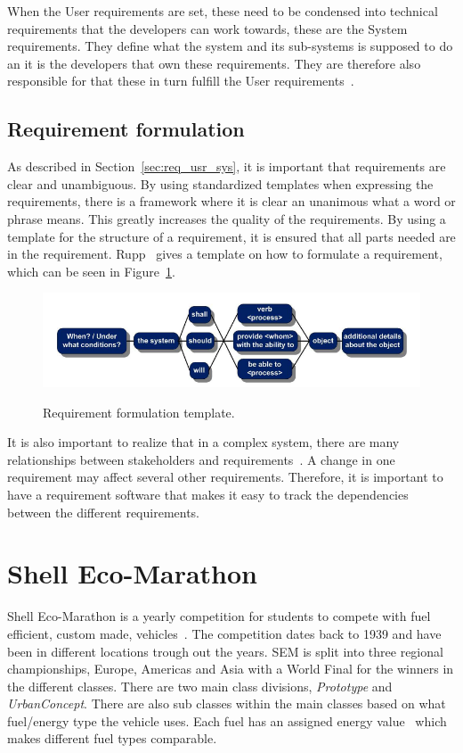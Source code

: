 When the User requirements are set, these need to be condensed into technical
requirements that the developers can work towards, these are the System
requirements. They define what the system and its sub-systems is supposed to do
an it is the developers that own these requirements. They are therefore also
responsible for that these in turn fulfill the User requirements~\cite{ibm_req}.

\subsection{Requirement formulation}
As described in Section~\ref{sec:req_usr_sys}, it is important that requirements
are clear and unambiguous. By using standardized templates when expressing the
requirements, there is a framework where it is clear an unanimous what a word or
phrase means.  This greatly increases the quality of the
requirements\cite{rupp2014}.  By using a template for the structure of a
requirement, it is ensured that all parts needed are in the requirement.
Rupp~\cite{rupp2014} gives a template on how to formulate a
requirement, which can be seen in Figure~\ref{fig:req_template}.
\begin{figure}[H]
    \centering\label{fig:req_template}
    \includegraphics[width=\textwidth]{./img/introduction_req_template.PNG}
    \caption{Requirement formulation template.}
\end{figure}
It is also important to realize that in a complex system, there are many
relationships between stakeholders and requirements~\cite{ibm_req}. A change in
one requirement may affect several other requirements. Therefore, it is
important to have a requirement software that makes it easy to track the
dependencies between the different requirements.

\section{Shell Eco-Marathon}
Shell Eco-Marathon is a yearly competition for students to compete with fuel
efficient, custom made, vehicles~\cite{SEM_web}. The competition dates back to
1939 and have been in different locations trough out the years. SEM is split
into three regional championships, Europe, Americas and Asia with a World Final
for the winners in the different classes. There are two main class divisions,
\textit{Prototype} and \textit{UrbanConcept}. There are also sub classes within
the main classes based on what fuel/energy type the vehicle uses. Each fuel has
an assigned energy value~\cite{semrules16c1} which makes different fuel types
comparable.

